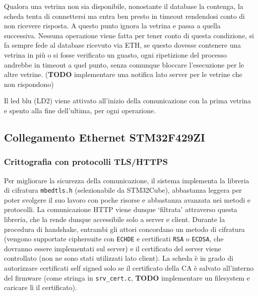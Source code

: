 Qualora una vetrina non sia disponibile, nonostante il database la contenga, la scheda tenta di connettersi ma entra ben presto in timeout rendendosi conto di non ricevere risposta. A questo punto ignora la vetrina e passa a quella successiva. Nessuna operazione viene fatta per tener conto di questa condizione, si fa sempre fede al database ricevuto via ETH, se questo dovesse contenere una vetrina in pi\`u o si fosse verificato un guasto, ogni ripetizione del processo andrebbe in timeout a quel punto, senza comunque bloccare l'esecuzione per le altre vetrine. (\textbf{TODO} implementare una notifica lato server per le vetrine che non rispondono)

Il led blu (LD2) viene attivato all'inizio della comunicazione con la prima vetrina e spento alla fine dell'ultima, per ogni operazione.

\subsection{Collegamento Ethernet STM32F429ZI}

\subsubsection{Crittografia con protocolli TLS/HTTPS}

Per migliorare la sicurezza della comunicazione, il sistema implementa la libreria di cifratura \texttt{mbedtls.h} (selezionabile da STM32Cube), abbastanza leggera per poter svolgere il suo lavoro con poche risorse e abbastanza avanzata nei metodi e protocolli. La comunicazione HTTP viene dunque `filtrata' attraverso questa libreria, che la rende dunque accessibile solo a server e client. Durante la procedura di handshake, entrambi gli attori concordano un metodo di cifratura (vengono supportate ciphersuite con \texttt{ECHDE} e certificati \texttt{RSA} o \texttt{ECDSA}, che dovranno essere implementati sul server) e il certificato del server viene controllato (non ne sono stati utilizzati lato client). La scheda \`e in grado di autorizzare certificati self signed solo se il certificato della CA \`e salvato all'interno del firmware (come stringa in \texttt{srv\_cert.c}, \textbf{TODO} implementare un filesystem e caricare l\`i il certificato).

